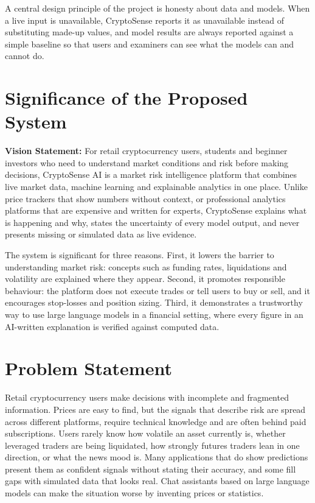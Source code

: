 A central design principle of the project is honesty about data and models. When a live input is unavailable, CryptoSense reports it as unavailable instead of substituting made-up values, and model results are always reported against a simple baseline so that users and examiners can see what the models can and cannot do.

\section{Significance of the Proposed System}
\textbf{Vision Statement:} For retail cryptocurrency users, students and beginner investors who need to understand market conditions and risk before making decisions, CryptoSense AI is a market risk intelligence platform that combines live market data, machine learning and explainable analytics in one place. Unlike price trackers that show numbers without context, or professional analytics platforms that are expensive and written for experts, CryptoSense explains what is happening and why, states the uncertainty of every model output, and never presents missing or simulated data as live evidence.

The system is significant for three reasons. First, it lowers the barrier to understanding market risk: concepts such as funding rates, liquidations and volatility are explained where they appear. Second, it promotes responsible behaviour: the platform does not execute trades or tell users to buy or sell, and it encourages stop-losses and position sizing. Third, it demonstrates a trustworthy way to use large language models in a financial setting, where every figure in an AI-written explanation is verified against computed data.

\section{Problem Statement}
Retail cryptocurrency users make decisions with incomplete and fragmented information. Prices are easy to find, but the signals that describe risk are spread across different platforms, require technical knowledge and are often behind paid subscriptions. Users rarely know how volatile an asset currently is, whether leveraged traders are being liquidated, how strongly futures traders lean in one direction, or what the news mood is. Many applications that do show predictions present them as confident signals without stating their accuracy, and some fill gaps with simulated data that looks real. Chat assistants based on large language models can make the situation worse by inventing prices or statistics.

